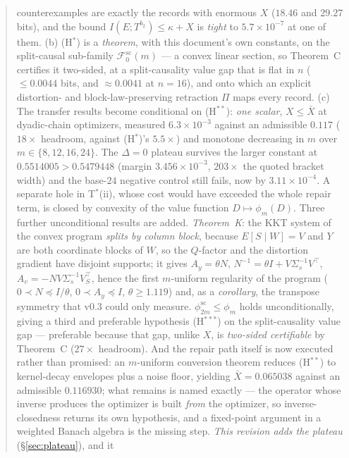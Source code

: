 \documentclass[11pt]{article}
\theoremstyle{definition}
\theoremstyle{remark}
\begin{document}
\begin{abstract}
counterexamples are exactly the records with enormous $X$ ($18.46$ and
$29.27$ bits), and the bound $I(E;T^{b_2})\le\kappa+X$ is \emph{tight}
to $5.7\times10^{-7}$ at one of them. (b) (H$^\ast$) is a
\emph{theorem}, with this document's own constants, on the
split-causal sub-family $\mathcal F_0^{\mathrm{sc}}(m)$ --- a convex
linear section, so Theorem~C certifies it two-sided, at a
split-causality value gap that is flat in $n$ ($\le0.0044$ bits, and
$\approx0.0041$ at $n=16$), and onto which an explicit distortion- and
block-law-preserving retraction $\Pi$ maps every record. (c) The
transfer results
become conditional on (H$^{\ast\ast}$): \emph{one scalar}, $X\le\bar X$
at dyadic-chain optimizers, measured $6.3\times10^{-3}$ against an
admissible $0.117$ ($18\times$ headroom, against (H$^\ast$)'s
$5.5\times$) and monotone decreasing in $m$ over $m\in\{8,12,16,24\}$.
The $\Delta=0$ plateau survives the larger constant at
$0.5514005>0.5479448$ (margin $3.456\times10^{-3}$, $203\times$ the
quoted bracket width) and the base-$24$ negative control still fails,
now by $3.11\times10^{-4}$. A separate hole in T$^\ast$(ii), whose cost
would have exceeded the whole repair term, is closed by convexity of
the value function $D\mapsto\phi_m(D)$.
Three further unconditional results are added. \emph{Theorem~K}: the
KKT system of the convex program \emph{splits by column block},
because $E[S\mid W]=V$ and $Y$ are both coordinate blocks of $W$, so
the $Q$-factor and the distortion gradient have disjoint supports; it
gives $A_y=\theta N$, $N^{-1}=\theta I+V\Sigma_s^{-1}V^{\!\top}$,
$A_v=-NV\Sigma_s^{-1}V_S^{\!\top}$, hence the first $m$-uniform
regularity of the program ($0\prec N\preceq I/\theta$,
$0\prec A_y\preceq I$, $\theta\ge1.119$) and, as a \emph{corollary},
the transpose symmetry that v0.3 could only measure.
$\phi^{\mathrm{sc}}_{2m}\le\phi_m$ holds unconditionally, giving a
third and preferable hypothesis (H$^{\ast\ast\ast}$) on the
split-causality value gap --- preferable because that gap, unlike $X$,
is \emph{two-sided certifiable} by Theorem~C ($27\times$ headroom).
And the repair path itself is now executed rather than promised: an
$m$-uniform conversion theorem reduces (H$^{\ast\ast}$) to kernel-decay
envelopes plus a noise floor, yielding $\bar X=0.065038$ against an
admissible $0.116930$; what remains is named exactly --- the operator
whose inverse produces the optimizer is built \emph{from} the
optimizer, so inverse-closedness returns its own hypothesis, and a
fixed-point argument in a weighted Banach algebra is the missing step.
\emph{This revision adds the plateau} (\S\ref{sec:plateau}), and it

\end{abstract}
\end{document}

